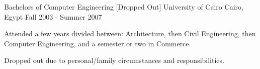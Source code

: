 

\begin{cventries}

	\cventry
	{Bachelors of Computer Engineering [Dropped Out]} %
	{University of Cairo} %
	{Cairo, Egypt} %
	{Fall 2003 - Summer 2007} %
	{
		\begin{cvitems} %
			\item {Attended a few years divided between: Architecture, then Civil Engineering, then Computer Engineering, and
			            a semester or two in Commerce.}
			\item{Dropped out due to personal/family circumstances and responsibilities.}
		\end{cvitems}
	}
\end{cventries}
